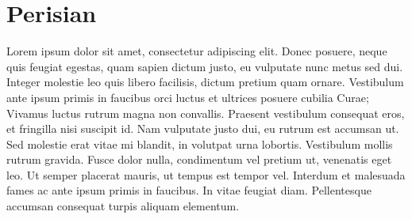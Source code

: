 \chapter{Perisian}

Lorem ipsum dolor sit amet, consectetur adipiscing elit. Donec posuere, neque quis feugiat egestas, quam sapien dictum justo, eu vulputate nunc metus sed dui. Integer molestie leo quis libero facilisis, dictum pretium quam ornare. Vestibulum ante ipsum primis in faucibus orci luctus et ultrices posuere cubilia Curae; Vivamus luctus rutrum magna non convallis. Praesent vestibulum consequat eros, et fringilla nisi suscipit id. Nam vulputate justo dui, eu rutrum est accumsan ut. Sed molestie erat vitae mi blandit, in volutpat urna lobortis. Vestibulum mollis rutrum gravida. Fusce dolor nulla, condimentum vel pretium ut, venenatis eget leo. Ut semper placerat mauris, ut tempus est tempor vel. Interdum et malesuada fames ac ante ipsum primis in faucibus. In vitae feugiat diam. Pellentesque accumsan consequat turpis aliquam elementum.